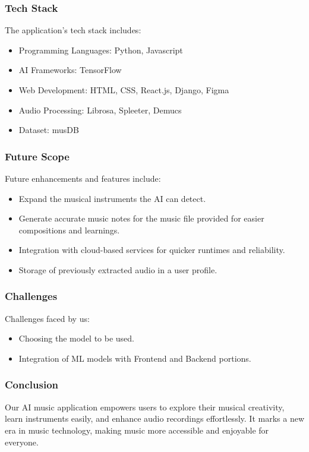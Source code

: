 \documentclass{beamer}
\begin{document}
\begin{frame}
  \frametitle{Tech Stack}
  The application's tech stack includes:
  \begin{itemize}
    \item Programming Languages: Python, Javascript
    \item AI Frameworks: TensorFlow
    \item Web Development: HTML, CSS, React.js, Django, Figma
    \item Audio Processing: Librosa, Spleeter, Demucs
    \item Dataset: musDB
  \end{itemize}
\end{frame}


\begin{frame}
  \frametitle{Future Scope}
  Future enhancements and features include:
  \begin{itemize}
    \item Expand the musical instruments the AI can detect.
    \item Generate accurate music notes for the music file provided for easier 
compositions and learnings.
    \item Integration with cloud-based services for quicker runtimes and reliability.
    \item Storage of previously extracted audio in a user profile.
  \end{itemize}
\end{frame}


\begin{frame}
  \frametitle{Challenges}
  Challenges faced by us:
  \begin{itemize}
    \item Choosing the model to be used.
    \item Integration of ML models with Frontend and Backend portions.
  \end{itemize}
\end{frame}

\begin{frame}
  \frametitle{Conclusion}
  Our AI music application empowers users to explore their musical creativity, 
learn instruments easily, and enhance audio recordings effortlessly. It marks 
a new era in music technology, making music more accessible and enjoyable for 
everyone.
\end{frame}

\end{document}
